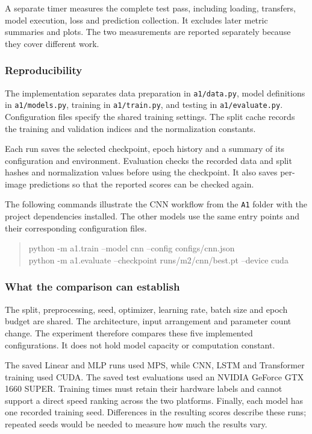 A separate timer measures the complete test pass, including loading, transfers,
model execution, loss and prediction collection. It excludes later metric
summaries and plots. The two measurements are reported separately because they
cover different work.

\subsubsection{Reproducibility}
The implementation separates data preparation in \texttt{a1/data.py}, model
definitions in \texttt{a1/models.py}, training in \texttt{a1/train.py}, and testing
in \texttt{a1/evaluate.py}. Configuration files specify the shared training
settings. The split cache records the training and validation indices and the
normalization constants.

Each run saves the selected checkpoint, epoch history and a summary of its
configuration and environment. Evaluation checks the recorded data and split
hashes and normalization values before using the checkpoint. It also saves
per-image predictions so that the reported scores can be checked again.

The following commands illustrate the CNN workflow from the \texttt{A1} folder
with the project dependencies installed. The other models use the same entry
points and their corresponding configuration files.
\begin{quote}\small\ttfamily
python -m a1.train --model cnn --config configs/cnn.json\\
python -m a1.evaluate --checkpoint runs/m2/cnn/best.pt --device cuda
\end{quote}

\subsubsection{What the comparison can establish}
The split, preprocessing, seed, optimizer, learning rate, batch size and epoch
budget are shared. The architecture, input arrangement and parameter count
change. The experiment therefore compares these five implemented configurations.
It does not hold model capacity or computation constant.

The saved Linear and MLP runs used MPS, while CNN, LSTM and Transformer training
used CUDA. The saved test evaluations used an NVIDIA GeForce GTX 1660 SUPER.
Training times must retain their hardware labels and cannot support a direct
speed ranking across the two platforms. Finally, each model has one recorded
training seed. Differences in the resulting scores describe these runs; repeated
seeds would be needed to measure how much the results vary.


